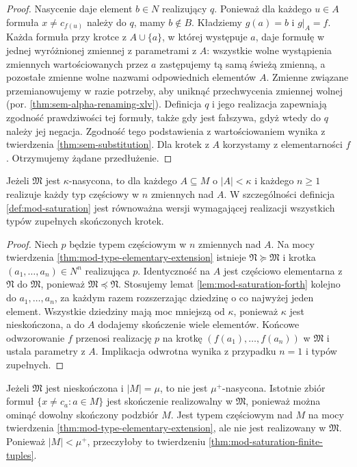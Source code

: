 \begin{proof}
Nasycenie daje element $b\in N$ realizujący $q$. Ponieważ dla
każdego $u\in A$ formuła $x\ne c_{f(u)}$ należy do $q$,
mamy $b\notin B$. Kładziemy $g(a)=b$ i $g|_A=f$.
Każda formuła przy krotce z $A\cup\{a\}$, w której
występuje $a$, daje formułę w jednej wyróżnionej zmiennej
z parametrami z $A$: wszystkie wolne wystąpienia zmiennych
wartościowanych przez $a$ zastępujemy tą samą świeżą zmienną,
a pozostałe zmienne wolne nazwami odpowiednich elementów $A$.
Zmienne związane przemianowujemy w razie potrzeby,
aby uniknąć przechwycenia zmiennej wolnej
(por. \ref{thm:sem-alpha-renaming-xlv}).
Definicja $q$ i jego realizacja zapewniają zgodność
prawdziwości tej formuły, także gdy jest fałszywa,
gdyż wtedy do $q$ należy jej negacja.
Zgodność tego podstawienia z wartościowaniem wynika
z twierdzenia \ref{thm:sem-substitution}. Dla krotek z $A$
korzystamy z elementarności $f$.
Otrzymujemy żądane przedłużenie.
\end{proof}

\begin{twierdzenie}
\label{thm:mod-saturation-finite-tuples}
Jeżeli $\mathfrak M$ jest $\kappa$-nasycona, to dla
każdego $A\subseteq M$ o $|A|<\kappa$ i każdego $n\geq1$
realizuje każdy typ częściowy w $n$ zmiennych nad $A$.
W szczególności definicja \ref{def:mod-saturation} jest
równoważna wersji wymagającej realizacji wszystkich
typów zupełnych skończonych krotek.
\end{twierdzenie}
\begin{proof}
Niech $p$ będzie typem częściowym w $n$ zmiennych nad $A$.
Na mocy twierdzenia \ref{thm:mod-type-elementary-extension}
istnieje $\mathfrak N\succeq\mathfrak M$ i krotka
$(a_1,\ldots,a_n)\in N^n$ realizująca $p$.
Identyczność na $A$ jest częściowo elementarna z
$\mathfrak N$ do $\mathfrak M$, ponieważ
$\mathfrak M\preccurlyeq\mathfrak N$. Stosujemy
lemat \ref{lem:mod-saturation-forth} kolejno do
$a_1,\ldots,a_n$, za każdym razem rozszerzając dziedzinę
o co najwyżej jeden element. Wszystkie dziedziny mają
moc mniejszą od $\kappa$, ponieważ $\kappa$ jest
nieskończona, a do $A$ dodajemy skończenie wiele elementów.
Końcowe odwzorowanie $f$ przenosi realizację $p$
na krotkę $(f(a_1),\ldots,f(a_n))$ w $\mathfrak M$
i ustala parametry z $A$. Implikacja odwrotna wynika
z przypadku $n=1$ i typów zupełnych.
\end{proof}

\begin{przyklad}
\label{ex:mod-saturation-size}
Jeżeli $\mathfrak M$ jest nieskończona i $|M|=\mu$,
to nie jest $\mu^+$-nasycona. Istotnie zbiór formuł
$\{x\ne c_a:a\in M\}$ jest skończenie realizowalny
w $\mathfrak M$, ponieważ można ominąć dowolny
skończony podzbiór $M$. Jest typem częściowym nad $M$
na mocy twierdzenia \ref{thm:mod-type-elementary-extension},
ale nie jest realizowany w $\mathfrak M$.
Ponieważ $|M|<\mu^+$, przeczyłoby to twierdzeniu
\ref{thm:mod-saturation-finite-tuples}.
\end{przyklad}

